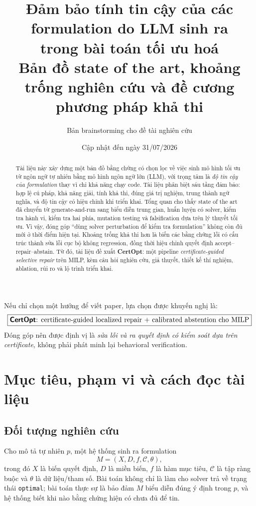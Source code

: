 \documentclass[11pt,a4paper]{article}
\title{\vspace{-1.2cm}
  \textbf{\color{navy}Đảm bảo tính tin cậy của các formulation do LLM sinh ra\\
  trong bài toán tối ưu hoá}\\[0.35em]
  \large Bản đồ state of the art, khoảng trống nghiên cứu và đề cương phương pháp khả thi
}
\author{Bản brainstorming cho đề tài nghiên cứu}
\date{Cập nhật đến ngày 31/07/2026}
\newcommand{\method}{\textsf{\textbf{CertOpt}}\xspace}
\begin{document}
\maketitle

\begin{abstract}
Tài liệu này xây dựng một bản đồ bằng chứng có chọn lọc về việc sinh mô hình tối ưu từ ngôn ngữ tự nhiên bằng mô hình ngôn ngữ lớn (LLM), với trọng tâm là \emph{độ tin cậy của formulation} thay vì chỉ khả năng chạy code. Tài liệu phân biệt sáu tầng đảm bảo: hợp lệ cú pháp, khả năng giải, tính khả thi, đúng giá trị nghiệm, trung thành ngữ nghĩa, và độ tin cậy có hiệu chỉnh khi triển khai. Tổng quan cho thấy state of the art đã chuyển từ generate-and-run sang biểu diễn trung gian, huấn luyện có solver, kiểm tra hành vi, kiểm tra hai phía, mutation testing và falsification dựa trên lý thuyết tối ưu. Vì vậy, đóng góp ``dùng solver perturbation để kiểm tra formulation'' không còn đủ mới ở thời điểm hiện tại. Khoảng trống khả thi hơn là biến các bằng chứng lỗi có cấu trúc thành sửa lỗi cục bộ không regression, đồng thời hiệu chỉnh quyết định accept--repair--abstain. Từ đó, tài liệu đề xuất \method: một pipeline \emph{certificate-guided selective repair} trên MILP, kèm câu hỏi nghiên cứu, giả thuyết, thiết kế thí nghiệm, ablation, rủi ro và lộ trình triển khai.
\end{abstract}

\begin{takeaway}
Nếu chỉ chọn một hướng để viết paper, lựa chọn được khuyến nghị là:
\[
\boxed{\text{\method: certificate-guided localized repair + calibrated abstention cho MILP}}
\]
Đóng góp nên được định vị là \emph{sửa lỗi và ra quyết định có kiểm soát dựa trên certificate}, không phải phát minh lại behavioral verification.
\end{takeaway}

\tableofcontents
\newpage

\section{Mục tiêu, phạm vi và cách đọc tài liệu}

\subsection{Đối tượng nghiên cứu}

Cho mô tả tự nhiên \(p\), một hệ thống sinh ra formulation
\[
M=(X,D,f,\mathcal{C},\theta),
\]
trong đó \(X\) là biến quyết định, \(D\) là miền biến, \(f\) là hàm mục tiêu, \(\mathcal{C}\) là tập ràng buộc và \(\theta\) là dữ liệu/tham số. Bài toán không chỉ là làm cho solver trả về trạng thái \texttt{optimal}; bài toán thực sự là bảo đảm \(M\) biểu diễn đúng ý định trong \(p\), và hệ thống biết khi nào bằng chứng hiện có chưa đủ để tin.
\end{document}
